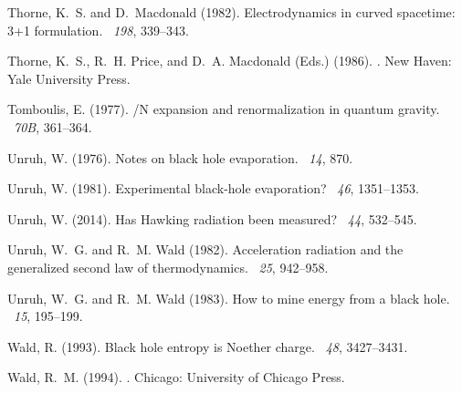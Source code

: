\documentclass[12pt]{article}
\begin{document}
\begin{thebibliography}{}
Thorne, K.~S. and D.~Macdonald (1982).
\newblock Electrodynamics in curved spacetime: 3+1 formulation.
~{\em 198},
  339--343.

Thorne, K.~S., R.~H. Price, and D.~A. Macdonald (Eds.) (1986).
.
\newblock New Haven: Yale University Press.

Tomboulis, E. (1977).
/{N} expansion and renormalization in quantum gravity.
~{\em 70B}, 361--364.

Unruh, W. (1976).
\newblock Notes on black hole evaporation.
~{\em 14}, 870.

Unruh, W. (1981).
\newblock Experimental black-hole evaporation?
~{\em 46}, 1351--1353.

Unruh, W. (2014).
\newblock Has {H}awking radiation been measured?
~{\em 44}, 532--545.

Unruh, W.~G. and R.~M. Wald (1982).
\newblock Acceleration radiation and the generalized second law of
  thermodynamics.
~{\em 25}, 942--958.

Unruh, W.~G. and R.~M. Wald (1983).
\newblock How to mine energy from a black hole.
~{\em 15}, 195--199.

Wald, R. (1993).
\newblock Black hole entropy is {N}oether charge.
~{\em 48}, 3427--3431.

Wald, R.~M. (1994).
.
\newblock Chicago: University of Chicago Press.


\end{thebibliography}
\end{document}
